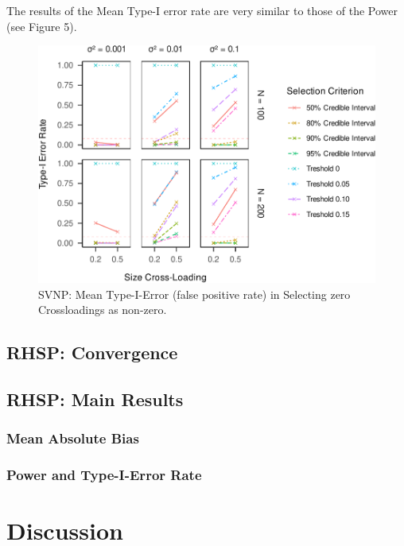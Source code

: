 \documentclass[
  man, donotrepeattitle,floatsintext]{apa6}
\begin{document}
The results of the Mean Type-I error rate are very similar to those of the Power (see Figure 5).

\begin{figure}
\centering
\includegraphics{JMBKoch_thesis_files/figure-latex/unnamed-chunk-5-1.pdf}
\caption{\label{fig:unnamed-chunk-5}SVNP: Mean Type-I-Error (false positive rate) in Selecting zero Crossloadings as non-zero.}
\end{figure}

\hypertarget{rhsp-convergence}{%
\subsection{RHSP: Convergence}\label{rhsp-convergence}}

\hypertarget{rhsp-main-results}{%
\subsection{RHSP: Main Results}\label{rhsp-main-results}}

\hypertarget{mean-absolute-bias-2}{%
\subsubsection{Mean Absolute Bias}\label{mean-absolute-bias-2}}

\hypertarget{power-and-type-i-error-rate-2}{%
\subsubsection{Power and Type-I-Error Rate}\label{power-and-type-i-error-rate-2}}

\hypertarget{discussion}{%
\section{Discussion}\label{discussion}}
\end{document}

